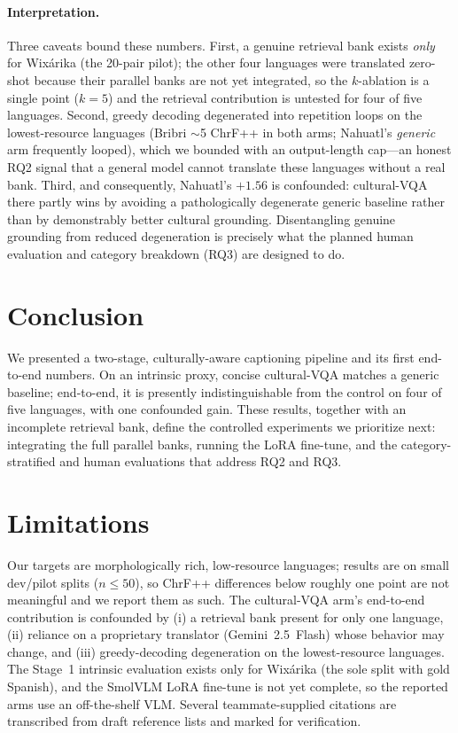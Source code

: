 \documentclass[11pt]{article}
\begin{document}
\paragraph{Interpretation.} Three caveats bound these numbers. First, a genuine
retrieval bank exists \emph{only} for Wixárika (the 20-pair pilot); the other four
languages were translated zero-shot because their parallel banks are not yet
integrated, so the $k$-ablation is a single point ($k{=}5$) and the retrieval
contribution is untested for four of five languages. Second, greedy decoding
degenerated into repetition loops on the lowest-resource languages (Bribri
$\sim$5 ChrF++ in both arms; Nahuatl's \emph{generic} arm frequently looped),
which we bounded with an output-length cap—an honest RQ2 signal that a general
model cannot translate these languages without a real bank. Third, and
consequently, Nahuatl's $+1.56$ is confounded: cultural-VQA there partly wins by
avoiding a pathologically degenerate generic baseline rather than by demonstrably
better cultural grounding. Disentangling genuine grounding from reduced
degeneration is precisely what the planned human evaluation and category
breakdown (RQ3) are designed to do.

\section{Conclusion}
We presented a two-stage, culturally-aware captioning pipeline and its first
end-to-end numbers. On an intrinsic proxy, concise cultural-VQA matches a generic
baseline; end-to-end, it is presently indistinguishable from the control on four
of five languages, with one confounded gain. These results, together with an
incomplete retrieval bank, define the controlled experiments we prioritize next:
integrating the full parallel banks, running the LoRA fine-tune, and the
category-stratified and human evaluations that address RQ2 and RQ3.

\section*{Limitations}
Our targets are morphologically rich, low-resource languages; results are on
small dev/pilot splits ($n{\leq}50$), so ChrF++ differences below roughly one
point are not meaningful and we report them as such. The cultural-VQA arm's
end-to-end contribution is confounded by (i) a retrieval bank present for only
one language, (ii) reliance on a proprietary translator (Gemini~2.5~Flash) whose
behavior may change, and (iii) greedy-decoding degeneration on the lowest-resource
languages. The Stage~1 intrinsic evaluation exists only for Wixárika (the sole
split with gold Spanish), and the SmolVLM LoRA fine-tune is not yet complete, so
the reported arms use an off-the-shelf VLM. Several teammate-supplied citations
are transcribed from draft reference lists and marked for verification.
\end{document}
